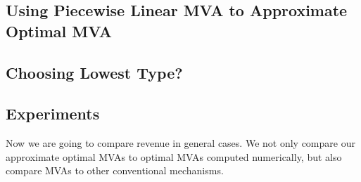 \subsection{Using Piecewise Linear MVA to Approximate Optimal MVA}

\subsection{Choosing Lowest Type?}

\subsection{Experiments}

Now we are going to compare revenue in general cases. We not only compare our
approximate optimal MVAs to optimal MVAs computed numerically, but also compare
MVAs to other conventional mechanisms.


